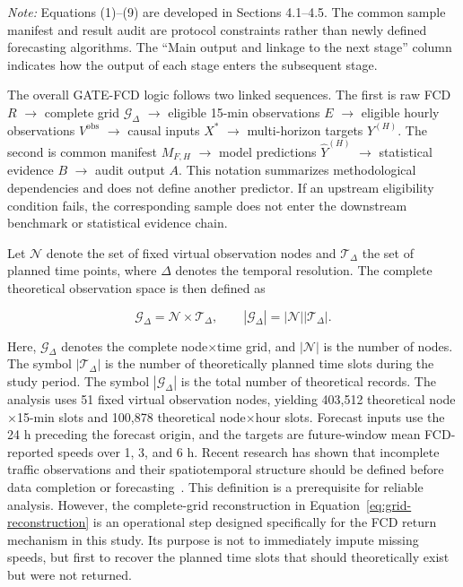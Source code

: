 \documentclass[pdflatex,sn-mathphys-num,iicol]{sn-jnl}
\begin{document}
\begin{table}[!t]
\vspace{2mm}

\begin{flushleft}
\footnotesize
\textit{Note:} Equations (1)--(9) are developed in Sections 4.1--4.5. The common sample manifest and result audit are protocol constraints rather than newly defined forecasting algorithms. The ``Main output and linkage to the next stage'' column indicates how the output of each stage enters the subsequent stage.
\end{flushleft}

\end{table}


The overall GATE-FCD logic follows two linked sequences. The first is raw FCD $R$ $\rightarrow$ complete grid $\mathcal{G}_{\Delta}$ $\rightarrow$ eligible 15-min observations $E$ $\rightarrow$ eligible hourly observations $V^{\mathrm{obs}}$ $\rightarrow$ causal inputs $X^{*}$ $\rightarrow$ multi-horizon targets $Y^{(H)}$. The second is common manifest $M_{F,H}$ $\rightarrow$ model predictions $\hat{Y}^{(H)}$ $\rightarrow$ statistical evidence $B$ $\rightarrow$ audit output $A$. This notation summarizes methodological dependencies and does not define another predictor. If an upstream eligibility condition fails, the corresponding sample does not enter the downstream benchmark or statistical evidence chain.

Let $\mathcal{N}$ denote the set of fixed virtual observation nodes and $\mathcal{T}_{\Delta}$ the set of planned time points, where $\Delta$ denotes the temporal resolution. The complete theoretical observation space is then defined as

\begin{equation}
\mathcal{G}_{\Delta}
=
\mathcal{N}\times\mathcal{T}_{\Delta},
\qquad
\left|\mathcal{G}_{\Delta}\right|
=
\left|\mathcal{N}\right|
\left|\mathcal{T}_{\Delta}\right|.
\label{eq:grid-reconstruction}
\end{equation}

Here, $\mathcal{G}_{\Delta}$ denotes the complete node$\times$time grid, and $|\mathcal{N}|$ is the number of nodes. The symbol $|\mathcal{T}_{\Delta}|$ is the number of theoretically planned time slots during the study period. The symbol $|\mathcal{G}_{\Delta}|$ is the total number of theoretical records. The analysis uses 51 fixed virtual observation nodes, yielding 403,512 theoretical node$\times$15-min slots and 100,878 theoretical node$\times$hour slots. Forecast inputs use the 24 h preceding the forecast origin, and the targets are future-window mean FCD-reported speeds over 1, 3, and 6 h. Recent research has shown that incomplete traffic observations and their spatiotemporal structure should be defined before data completion or forecasting~\cite{Chen2024TrafficCompletion,Bikram2024Imputation,Chan2023MissingTrafficData}. This definition is a prerequisite for reliable analysis. However, the complete-grid reconstruction in Equation~\ref{eq:grid-reconstruction} is an operational step designed specifically for the FCD return mechanism in this study. Its purpose is not to immediately impute missing speeds, but first to recover the planned time slots that should theoretically exist but were not returned.
\end{document}

